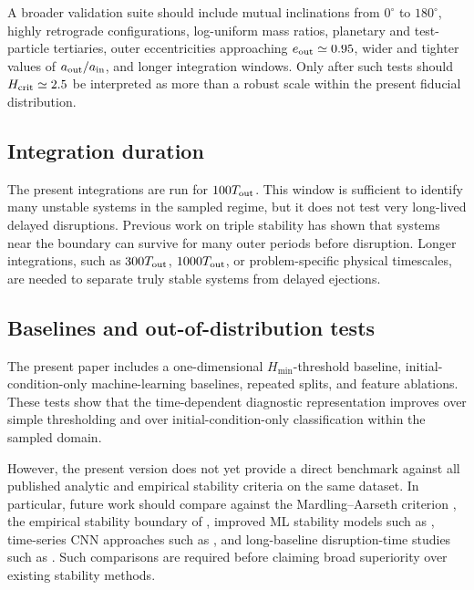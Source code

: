 \documentclass[12pt,a4paper]{article}
\newcommand{\Hcrit}{H_{\rm crit}}
\newcommand{\Hmin}{H_{\min}}
\newcommand{\Tout}{T_{\rm out}}
\begin{document}
A broader validation suite should include mutual inclinations from \(0^\circ\) to \(180^\circ\), highly retrograde configurations, log-uniform mass ratios, planetary and test-particle tertiaries, outer eccentricities approaching \(e_{\rm out}\simeq0.95\), wider and tighter values of \(a_{\rm out}/a_{\rm in}\), and longer integration windows. Only after such tests should \(\Hcrit\simeq2.5\) be interpreted as more than a robust scale within the present fiducial distribution.

\subsection{Integration duration}
\label{sec:integration_duration_limit}

The present integrations are run for \(100\Tout\). This window is sufficient to identify many unstable systems in the sampled regime, but it does not test very long-lived delayed disruptions. Previous work on triple stability has shown that systems near the boundary can survive for many outer periods before disruption. Longer integrations, such as \(300\Tout\), \(1000\Tout\), or problem-specific physical timescales, are needed to separate truly stable systems from delayed ejections.

\subsection{Baselines and out-of-distribution tests}
\label{sec:baseline_ood_future}

The present paper includes a one-dimensional \(\Hmin\)-threshold baseline, initial-condition-only machine-learning baselines, repeated splits, and feature ablations. These tests show that the time-dependent diagnostic representation improves over simple thresholding and over initial-condition-only classification within the sampled domain.

However, the present version does not yet provide a direct benchmark against all published analytic and empirical stability criteria on the same dataset. In particular, future work should compare against the Mardling--Aarseth criterion \citep{Mardling2001}, the empirical stability boundary of \citet{Tory2022}, improved ML stability models such as \citet{Vynatheya2022}, time-series CNN approaches such as \citet{LalandeTrani2022}, and long-baseline disruption-time studies such as \citet{Hayashi2022,Hayashi2023}. Such comparisons are required before claiming broad superiority over existing stability methods.
\end{document}
